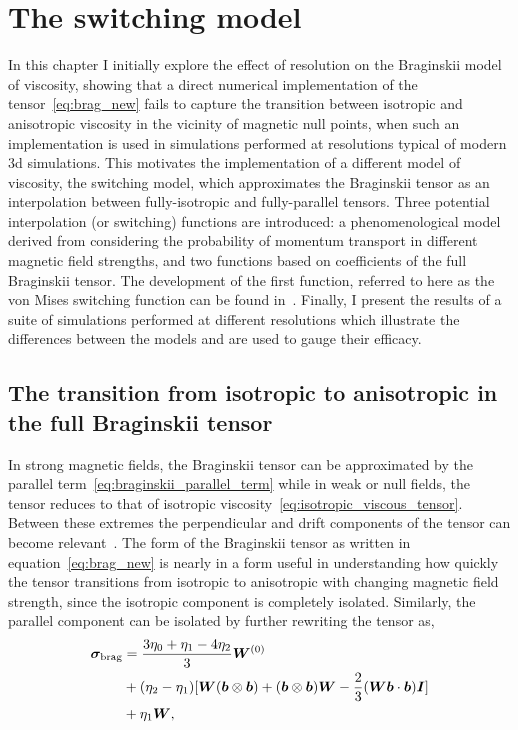 \chapter{The switching model}
\label{chp:switching_model}

\graphicspath{{images/development_of_switching_model/}}

In this chapter I initially explore the effect of resolution on the Braginskii model of viscosity, showing that a direct numerical implementation of the tensor~\eqref{eq:brag_new} fails to capture the transition between isotropic and anisotropic viscosity in the vicinity of magnetic null points, when such an implementation is used in simulations performed at resolutions typical of modern 3d simulations. This motivates the implementation of a different model of viscosity, the switching model, which approximates the Braginskii tensor as an interpolation between fully-isotropic and fully-parallel tensors. Three potential interpolation (or switching) functions are introduced: a phenomenological model derived from considering the probability of momentum transport in different magnetic field strengths, and two functions based on coefficients of the full Braginskii tensor. The development of the first function, referred to here as the von Mises switching function can be found in~\cite{mactaggartBraginskiiMagnetohydrodynamicsArbitrary2017}. Finally, I present the results of a suite of simulations performed at different resolutions which illustrate the differences between the models and are used to gauge their efficacy.

\section{The transition from isotropic to anisotropic in the full Braginskii tensor}

In strong magnetic fields, the Braginskii tensor can be approximated by the parallel term~\eqref{eq:braginskii_parallel_term} while in weak or null fields, the tensor reduces to that of isotropic viscosity~\eqref{eq:isotropic_viscous_tensor}. Between these extremes the perpendicular and drift components of the tensor can become relevant~\cite{erdelyiResonantAbsorptionAlfven1995a}. The form of the Braginskii tensor as written in equation~\eqref{eq:brag_new} is nearly in a form useful in understanding how quickly the tensor transitions from isotropic to anisotropic with changing magnetic field strength, since the isotropic component is completely isolated. Similarly, the parallel component can be isolated by further rewriting the tensor as,
\begin{equation}
\begin{split}
\ten{\sigma}_{\rm brag} &= \frac{3\eta_0+\eta_1-4\eta_2}{3}\ten{W}^{(0)}\\%
& + (\eta_2-\eta_1)[\ten{W}(\vec{b}\otimes\vec{b})+(\vec{b}\otimes\vec{b})\ten{W} - \frac{2}{3}(\ten{W}\vec{b}\cdot\vec{b})\ten{I}] \\%
& + \eta_1\ten{W},%
\end{split}
\label{eq:brag_new2}
\end{equation}

